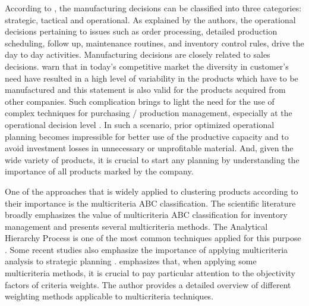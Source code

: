 \documentclass[10pt,fleqn,a4paper,twoside]{article}
\begin{document}
	According to \cite{Singhal2013}, the manufacturing decisions can be classified into three categories: strategic, tactical and operational. As explained by the authors, the operational decisions pertaining to issues such as order processing, detailed production scheduling, follow up, maintenance routines, and inventory control rules, drive the day to day activities. Manufacturing decisions are closely related to sales decisions. \cite{Ebrahimi2014} warn that in today’s competitive market the diversity in customer’s need have resulted in a high level of variability in the products which have to be manufactured and this statement is also valid for the products acquired from other companies. Such complication brings to light the need for the use of complex techniques for purchasing / production management, especially at the operational decision level \citep{Kiran2019}. In such a scenario, prior optimized operational planning becomes impressible for better use of the productive capacity and to avoid investment losses in unnecessary or unprofitable material. And, given the wide variety of products, it is crucial to start any planning by understanding the importance of all products marked by the company. 

	One of the approaches that is widely applied to clustering products according to their importance is the multicriteria ABC classification. The scientific literature broadly emphasizes the value of multicriteria ABC classification for inventory management and presents several multicriteria methods. The Analytical Hierarchy Process is one of the most common techniques applied for this purpose \citep{Flores1992, AltayGuvenir1998, Lolli2014, Balaji2014}. Some recent studies also emphasize the importance of applying multicriteria analysis to strategic planning \citep[\emph{e.g.},][]{BarbosaDePaula2022, Pereira2023, MarianoRibeiro2023}. \citet{Odu2019} emphasizes that, when applying some multicriteria methods, it is crucial to pay particular attention to the objectivity factors of criteria weights. The author provides a detailed overview of different weighting methods applicable to multicriteria techniques.
	
\end{document}
